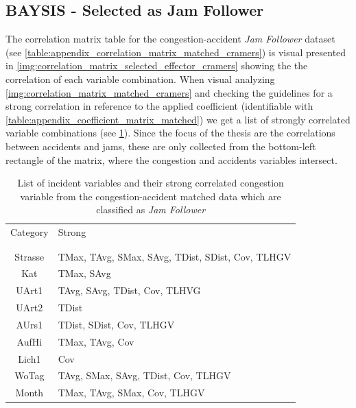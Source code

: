 \subsection{BAYSIS - Selected as Jam Follower}
\label{analysis_processing_correlation_baysis_follower}
The correlation matrix table for the congestion-accident \textit{Jam Follower} dataset (see \cref{table:appendix_correlation_matrix_matched_cramers}) is visual presented in \cref{img:correlation_matrix_selected_effector_cramers} showing the the correlation of each variable combination. When visual analyzing \cref{img:correlation_matrix_matched_cramers} and checking the guidelines for a strong correlation in reference to the applied coefficient (identifiable with \cref{table:appendix_coefficient_matrix_matched}) we get a list of strongly correlated variable combinations (see \cref{tbl:correlation_list_baysis_follower}). Since the focus of the thesis are the correlations between accidents and jams, these are only collected from the bottom-left rectangle of the matrix, where the congestion and accidents variables intersect.

\noindent
\begin{table}[h!]
	\centering
	\begin{tabular}{c|l}  
		Category & Strong \\
		\\[-1em]
		\hline
		\\[-1em]
		Strasse & TMax, TAvg, SMax, SAvg, TDist, SDist, Cov, TLHGV \\ 
 		Kat & TMax, SAvg\\ 
 		UArt1 & TAvg, SAvg, TDist, Cov, TLHVG \\
 		UArt2 & TDist \\
 		AUrs1 & TDist, SDist, Cov, TLHGV \\
 		AufHi & TMax, TAvg, Cov \\
 		Lich1 & Cov \\
 		WoTag & TAvg, SMax, SAvg, TDist, Cov, TLHGV \\
 		Month & TMax, TAvg, SMax, Cov, TLHGV \\
	\end{tabular}
    \caption{List of incident variables and their strong correlated congestion variable from the congestion-accident matched data which are classified as \textit{Jam Follower}}
	\label{tbl:correlation_list_baysis_follower}
\end{table}


